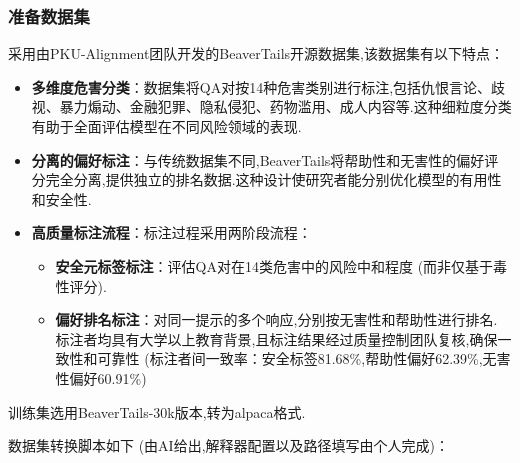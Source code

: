 \documentclass[12pt]{ctexart}
\begin{document}
\subsubsection{准备数据集}

采用由PKU-Alignment团队开发的BeaverTails开源数据集,该数据集有以下特点：

\begin{itemize}

    \item \textbf{多维度危害分类}：数据集将QA对按14种危害类别进行标注,包括仇恨言论、歧视、暴力煽动、金融犯罪、隐私侵犯、药物滥用、成人内容等.这种细粒度分类有助于全面评估模型在不同风险领域的表现.

    \item \textbf{分离的偏好标注}：与传统数据集不同,BeaverTails将帮助性和无害性的偏好评分完全分离,提供独立的排名数据.这种设计使研究者能分别优化模型的有用性和安全性.

    \item \textbf{高质量标注流程}：标注过程采用两阶段流程：

          \begin{itemize}

              \item \textbf{安全元标签标注}：评估QA对在14类危害中的风险中和程度 (而非仅基于毒性评分).

              \item \textbf{偏好排名标注}：对同一提示的多个响应,分别按无害性和帮助性进行排名.
                    标注者均具有大学以上教育背景,且标注结果经过质量控制团队复核,确保一致性和可靠性 (标注者间一致率：安全标签81.68\%,帮助性偏好62.39\%,无害性偏好60.91\%)

          \end{itemize}

\end{itemize}

训练集选用BeaverTails-30k版本,转为alpaca格式.

数据集转换脚本如下 (由AI给出,解释器配置以及路径填写由个人完成)：
\end{document}
